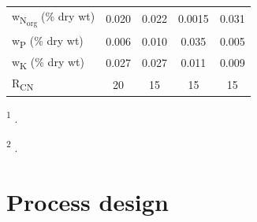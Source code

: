 \begin{refsection}[referencesCh7]
\begin{table}[h]
{\begin{tabular}{@{}lcccc@{}}
			w\textsubscript{N\textsubscript{org}} (\% dry wt) & 0.020                                                                               & 0.022                                                                                           & 0.0015                                                                                    & 0.031                                                                                  \\
			w\textsubscript{P} (\% dry wt)    & 0.006                                                                               & 0.010                                                                                           & 0.035                                                                                     & 0.005                                                                                  \\
			w\textsubscript{K} (\% dry wt)    & 0.027                                                                               & 0.027                                                                                           & 0.011                                                                                     & 0.009                                                                                  \\
			R\textsubscript{CN}               & 20                                                                                  & 15                                                                                              & 15                                                                                        & 15                                                                                     \\ \bottomrule
		\end{tabular}
	}
\begin{tablenotes}
	\footnotesize
	\item \textsuperscript{1} \protect\citet{EuropeanCommission4953_2_11768_1}.
	\item \textsuperscript{2} \protect\citet{DanishEnvironmentalProtectionAgency2018}.
\end{tablenotes}
\end{table}


\section{Process design}\label{section:Sec3}

\end{refsection}
